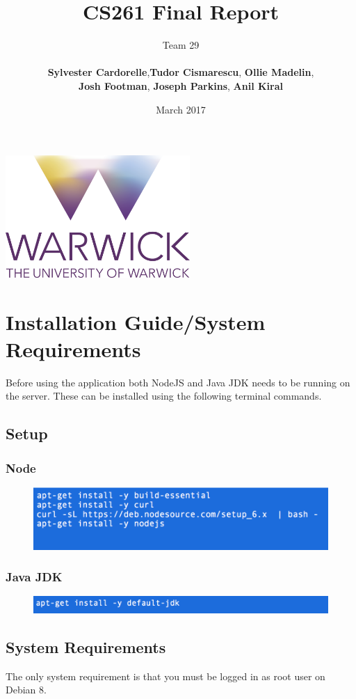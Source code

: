 \documentclass[12pt]{article}
\title{CS261 Final Report}
\author{Team 29 \\\\ \textbf{Sylvester Cardorelle},\textbf{Tudor Cismarescu}, \textbf{Ollie Madelin},\\
\textbf{Josh Footman}, \textbf{Joseph Parkins}, \textbf{Anil Kiral}}
\date{March 2017}
\begin{document}
\begin{titlepage}
\maketitle
\centering
\vfill
\vfill
\includegraphics[width=7cm]{logo.png}
\vfill
\vfill
\thispagestyle{empty}
\end{titlepage}
\tableofcontents
\newpage
\section{Installation Guide/System Requirements }
  Before using the application both NodeJS and Java JDK needs to be running on the server.
  These can be installed using the following terminal commands.
	\subsection{Setup}
		\subsubsection{Node}
    \begin{figure}[H]
    \centering
    \includegraphics[width=120mm]{node.png}
    \end{figure}
    \subsubsection{Java JDK}
    \begin{figure}[H]
    \centering
    \includegraphics[width=120mm]{java.png}
    \end{figure}
  \subsection{System Requirements}
  The only system requirement is that you must be logged in as root user on Debian 8.
\end{document}

